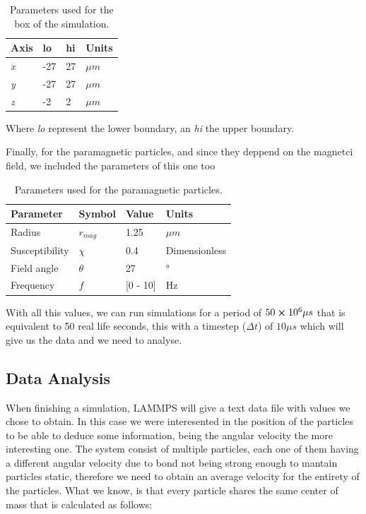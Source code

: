 \begin{table}[H]
\centering
\caption[Simulation box physical parameters.]{Parameters used for the box of the simulation.}
\begin{tabular}{l l l l}
\hline
Axis & lo  & hi & Units \\
\hline
\textit{x} & -27 & 27 & \( \mu m\) \\
\textit{y} & -27 & 27 & \( \mu m\) \\
\textit{z} & -2  & 2   & \( \mu m\)\\ 
\hline
\end{tabular}
\end{table}

Where \textit{lo} represent the lower boundary, an \textit{hi} the upper boundary.

Finally, for the paramagnetic particles, and since they deppend on the magnetci field, we included the parameters of this one too


\begin{table}[H]
\centering
\caption[Paramagnetic colloids parameters.]{Parameters used for the paramagnetic particles.}
\begin{tabular}{l l l l}
\hline
Parameter & Symbol  & Value & Units \\
\hline
Radius & $r_{mag}$ &  1.25 &\( \mu m\) \\
Susceptibility & $\chi$ & 0.4 & Dimensionless\\
Field angle & $\theta$ & 27 & °\\
Frequency & $f$ & [0 - 10] & Hz\\
\hline
\end{tabular}
\end{table}

With all this values, we can run simulations for a period of $50 \cross 10^{6} \mu s$ that is equivalent to 50 real life seconds, this with a timestep ($\Delta t$) of  $10 \mu s$ which will give us the data and we need to analyse.

\subsection{Data Analysis}

When finishing a simulation, LAMMPS will give a text data file with values we chose to obtain. In this case we were interesented in the position of the particles to be able to deduce some information, being the angular velocity the more interesting one. The system consist of multiple particles, each one of them having a different angular velocity due to bond not being strong enough to mantain particles static, therefore we need to obtain an average velocity for the entirety of the particles. What we know, is that every particle shares the same center of mass that is calculated as follows:

